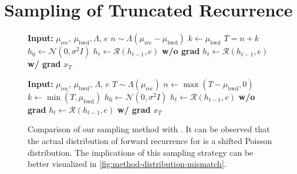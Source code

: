 \clearpage
\section{Sampling of Truncated Recurrence}
\label{sec:sampling-truncated-recurrence}

\begin{figure}[!h]
\centering
\begin{minipage}[t]{0.48\textwidth}
\begin{algorithm}[H]
\caption{\textsc{\citet{geiping_scaling_2025}}}
\label{alg:poisson-fill}
\begin{algorithmic}[1]
\State \textbf{Input:} $\mu_{\text{rec}}$, $\mu_{\text{bwd}}, \Lambda$, $e$
\State $n \sim \Lambda(\mu_{\text{rec}} - \mu_{\text{bwd}})$
\State $k \gets \mu_{\text{bwd}}$
\State $T = n + k$
\State $h_0 \gets \mathcal{N}(0, \sigma^2 I)$
        \State $h_t \gets \mathcal{R}(h_{t-1}, e)$ \textbf{w/o grad}
    \Else
        \State $h_t \gets \mathcal{R}(h_{t-1}, e)$ \textbf{w/ grad}
    \EndIf
\EndFor
\State \Return $x_T$
\end{algorithmic}
\end{algorithm}
\end{minipage}
\hfill
\begin{minipage}[t]{0.48\textwidth}
\begin{algorithm}[H]
\caption{\textsc{Correction (Ours)}}
\label{alg:poisson-trunc-full}
\begin{algorithmic}[1]
\State \textbf{Input:} $\mu_{\text{rec}}$, $\mu_{\text{bwd}}$, $\Lambda$, $e$
\State $T \sim \Lambda(\mu_{\text{rec}})$
\State $n \gets \max(T - \mu_{\text{bwd}}, 0)$
\State $k \gets \min(T, \mu_{\text{bwd}})$
\State $h_0 \gets \mathcal{N}(0, \sigma^2 I)$
        \State $h_t \gets \mathcal{R}(h_{t-1}, e)$ \textbf{w/o grad}
    \Else
        \State $h_t \gets \mathcal{R}(h_{t-1}, e)$ \textbf{w/ grad}
    \EndIf
\EndFor
\State \Return $x_T$
\end{algorithmic}
\end{algorithm}
\end{minipage}
\caption{Comparison of our sampling method with \cite{geiping_scaling_2025}. It can be observed that the actual distribution of forward recurrence for \cite{geiping_scaling_2025} is a shifted Poisson distribution. The implications of this sampling strategy can be better visualized in \cref{fig:method-distribution-mismatch}.}
\label{fig:sampling-algos}
\end{figure}


